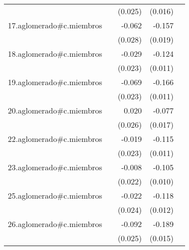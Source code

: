 {\begin{longtable}{l*{4}{D{.}{.}{-1}}}
            &                     &     (0.025)         &     (0.016)         &                     \\
\addlinespace
17.aglomerado#c.miembros&                     &      -0.062\sym{*}  &      -0.157\sym{***}&                     \\
            &                     &     (0.028)         &     (0.019)         &                     \\
\addlinespace
18.aglomerado#c.miembros&                     &      -0.029         &      -0.124\sym{***}&                     \\
            &                     &     (0.023)         &     (0.011)         &                     \\
\addlinespace
19.aglomerado#c.miembros&                     &      -0.069\sym{**} &      -0.166\sym{***}&                     \\
            &                     &     (0.023)         &     (0.011)         &                     \\
\addlinespace
20.aglomerado#c.miembros&                     &       0.020         &      -0.077\sym{***}&                     \\
            &                     &     (0.026)         &     (0.017)         &                     \\
\addlinespace
22.aglomerado#c.miembros&                     &      -0.019         &      -0.115\sym{***}&                     \\
            &                     &     (0.023)         &     (0.011)         &                     \\
\addlinespace
23.aglomerado#c.miembros&                     &      -0.008         &      -0.105\sym{***}&                     \\
            &                     &     (0.022)         &     (0.010)         &                     \\
\addlinespace
25.aglomerado#c.miembros&                     &      -0.022         &      -0.118\sym{***}&                     \\
            &                     &     (0.024)         &     (0.012)         &                     \\
\addlinespace
26.aglomerado#c.miembros&                     &      -0.092\sym{***}&      -0.189\sym{***}&                     \\
            &                     &     (0.025)         &     (0.015)         &                     \\

\end{longtable}}
